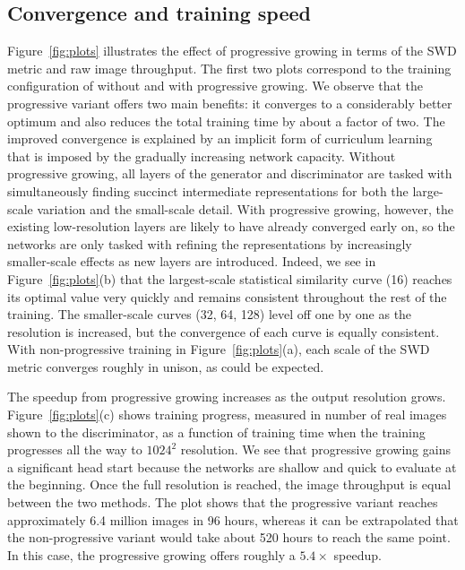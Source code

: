 \documentclass{article}
\begin{document}
\subsection{Convergence and training speed}
\label{sec:exp-training-speed}

\figplots

Figure~\ref{fig:plots} illustrates the effect of progressive growing in terms of the SWD metric and raw image throughput.
The first two plots correspond to the training configuration of \cite{Gulrajani2017} without and with progressive growing.
We observe that the progressive variant offers two main benefits: it converges to a considerably better optimum and also reduces the total training time by about a factor of two.
The improved convergence is explained by an implicit form of curriculum learning that is imposed by the gradually increasing network capacity.
Without progressive growing, all layers of the generator and discriminator are tasked with simultaneously finding succinct intermediate representations for both the large-scale variation and the small-scale detail.
With progressive growing, however, the existing low-resolution layers are likely to have already converged early on, so the networks are only tasked with refining the representations by increasingly smaller-scale effects as new layers are introduced.
Indeed, we see in Figure~\ref{fig:plots}(b) that the largest-scale statistical similarity curve (16) reaches its optimal value very quickly and remains consistent throughout the rest of the training.
The smaller-scale curves (32, 64, 128) level off one by one as the resolution is increased, but the convergence of each curve is equally consistent.
With non-progressive training in Figure~\ref{fig:plots}(a), each scale of the SWD metric converges roughly in unison, as could be expected.

The speedup from progressive growing increases as the output resolution grows.
Figure~\ref{fig:plots}(c) shows training progress, measured in number of real images shown to the discriminator, as a function of training time when the training progresses all the way to $1024^2$ resolution.
We see that progressive growing gains a significant head start because the networks are shallow and quick to evaluate at the beginning.
Once the full resolution is reached, the image throughput is equal between the two methods.
The plot shows that the progressive variant reaches approximately 6.4 million images in 96 hours, whereas it can be extrapolated that the non-progressive variant would take about 520 hours to reach the same point.
In this case, the progressive growing offers roughly a $5.4\times$ speedup.
\end{document}
